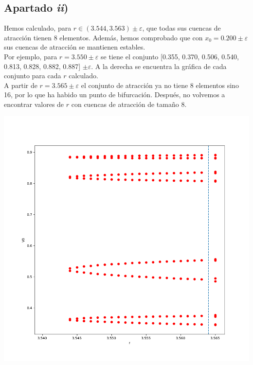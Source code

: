 \documentclass[a4paper]{article}
\newenvironment{sidefig}[1]
{\noindent\begin{minipage}[c]{#1\textwidth}}
	{\vfill\end{minipage}}
\newcommand{\herefig}[1]{%
\end{minipage}
\hfill
\noindent\begin{minipage}[c]{#1\textwidth} 
	\centering\vfill
}
\begin{document}
	\subsection{Apartado \textit{ii})}\vspace*{-2\bigskipamount}
	\begin{sidefig}{0.45}
	
	Hemos calculado, para $r\in(3.544,3.563)\pm \varepsilon$, que todas sus cuencas de atracción tienen 8 elementos. Además, hemos comprobado que con $x_0=0.200\pm \varepsilon$ sus cuencas de atracción se mantienen estables.\\[\medskipamount]
	Por ejemplo, para $r=3.550\pm \varepsilon$ se tiene el conjunto [0.355, 0.370, 0.506, 0.540, 0.813, 0.828, 0.882, 0.887] $\pm \varepsilon$. A la derecha se encuentra la gráfica de cada conjunto para cada $r$ calculado.\\[\medskipamount]
	A partir de $r=3.565\pm \varepsilon$ el conjunto de atracción ya no tiene 8 elementos sino 16, por lo que ha habido un punto de bifurcación. Después, no volvemos a encontrar valores de $r$ con cuencas de atracción de tamaño 8.
	
	\herefig{0.6}
	
	\includegraphics[width=\linewidth]{grafica}
	
	\end{sidefig}\vspace*{-\bigskipamount}
\end{document}

